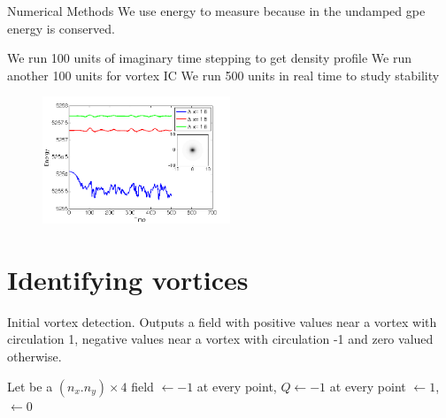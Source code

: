 \begin{chapter}{\label{cha:numerics}Numerical Methods}
	We use energy to measure because in the undamped gpe energy is conserved.

	We run 100 units of imaginary time stepping to get density profile
	We run another 100 units for vortex IC
	We run 500 units in real time to study stability


\begin{figure}
	\centering
	\includegraphics[width=0.5\textwidth]{numerics/figures/homg_energy_cons.png}
\end{figure}

\section{\label{section:vortexidentifying} Identifying vortices}

	\begin{algorithm}[H]
	\BlankLine


\caption{Initial vortex detection. Outputs a field with positive values near a vortex with circulation 1, negative values near a vortex with circulation -1 and zero valued otherwise.}\label{algo_calcvortexfield}
\end{algorithm}



	\begin{algorithm}[H]
	\BlankLine
	Let \Linked be a $(n_x.n_y) \times 4$ field\;
	\Linked$\leftarrow -1$ at every point, $Q\leftarrow -1$ at every point\;
	\Lc$\leftarrow 1$, \Rc$\leftarrow 0$\;


\end{algorithm}
\end{chapter}
